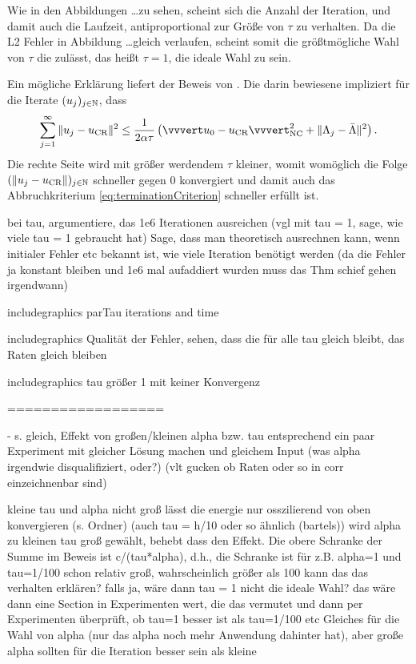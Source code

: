 Wie in den Abbildungen \ldots zu sehen, scheint sich die Anzahl der Iteration,
und damit auch die Laufzeit, antiproportional zur Größe von $\tau$ zu
verhalten.
Da die L2 Fehler in Abbildung \ldots gleich verlaufen, scheint somit die
größtmögliche Wahl von $\tau$ die  zulässt, das
heißt $\tau=1$, die ideale Wahl zu sein.

Ein mögliche Erklärung liefert der Beweis von .
Die darin bewiesene  impliziert für die
Iterate $(u_j)_{j\in\mathbb{N}}$, dass
\begin{align*}
  \sum_{j=1}^\infty\Vert u_j-\ucr\Vert^2 
  \leq
  \frac{1}{2\alpha\tau}\left(\vvvert u_0-\ucr\vvvert^2_\nc + \Vert \Lambda_j
  -\bar\Lambda\Vert^2\right). %
\end{align*}
Die rechte Seite wird mit größer werdendem $\tau$ kleiner, womit womöglich
die Folge $(\left\Vert u_j-u_\textup{CR}\right\Vert)_{j\in\mathbb{N}}$ schneller gegen $0$
konvergiert und damit auch das Abbruchkriterium \eqref{eq:terminationCriterion}
schneller erfüllt ist. 

bei tau, argumentiere, das 1e6 Iterationen ausreichen (vgl mit tau = 1, sage, 
wie viele tau = 1 gebraucht hat) Sage, dass man theoretisch ausrechnen kann,
wenn initialer Fehler etc bekannt ist, wie viele Iteration benötigt werden (da 
die Fehler ja konstant bleiben und 1e6 mal aufaddiert wurden muss das 
Thm schief gehen irgendwann)

includegraphics parTau iterations and time

includegraphics Qualität der Fehler, sehen, dass die für alle tau gleich bleibt,
das Raten gleich bleiben

includegraphics tau größer 1 mit keiner Konvergenz 

==================

  - s. gleich, Effekt von großen/kleinen alpha bzw. tau entsprechend ein
    paar Experiment mit gleicher Lösung machen und gleichem Input (was alpha
    irgendwie disqualifiziert, oder?) (vlt gucken ob Raten oder so in corr
    einzeichnenbar sind)

kleine tau und alpha nicht groß lässt die energie nur osszilierend von oben
konvergieren (s. Ordner) (auch tau = h/10 oder so ähnlich (bartels))
wird alpha zu kleinen tau groß gewählt, behebt dass den Effekt.
Die obere Schranke der Summe im Beweis ist c/(tau*alpha), d.h., die Schranke
ist für z.B. alpha=1 und tau=1/100 schon relativ groß, wahrscheinlich größer
als 100
kann das das verhalten erklären?
falls ja, wäre dann tau = 1 nicht die ideale Wahl?
das wäre dann eine Section in Experimenten wert, die das vermutet und dann per
Experimenten überprüft, ob tau=1 besser ist als tau=1/100 etc
Gleiches für die Wahl von alpha (nur das alpha noch mehr Anwendung dahinter hat),
aber große alpha sollten für die Iteration besser sein als kleine 

